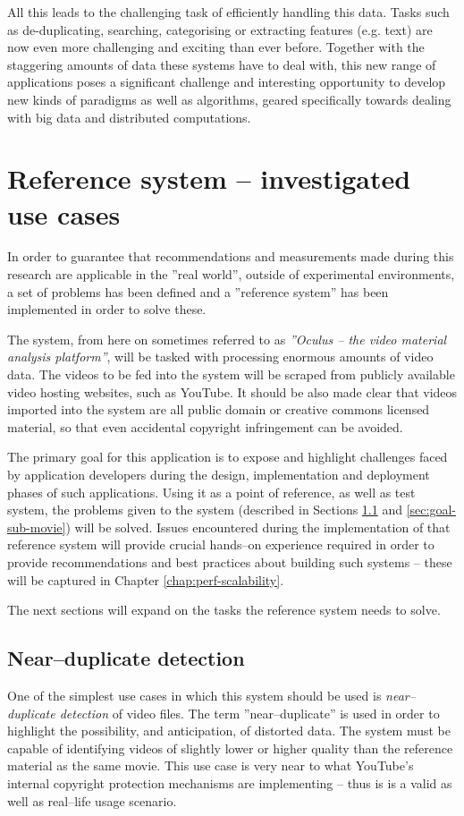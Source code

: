 All this leads to the challenging task of efficiently handling this data. Tasks such as de-duplicating, searching, categorising or extracting features (e.g. text) are now even more challenging and exciting than ever before. Together with the staggering amounts of data these systems have to deal with, this new range of applications poses a significant challenge and interesting opportunity to develop new kinds of paradigms as well as algorithms, geared specifically towards dealing with big data and distributed computations.


\section{Reference system -- investigated use cases}
\label{sec:ref-system}

In order to guarantee that recommendations and measurements made during this research are applicable in the ''real world'', outside of experimental environments, a set of problems has been defined and a ''reference system'' has been implemented in order to solve these.

The system, from here on sometimes referred to as \textit{''Oculus -- the video material analysis platform''}, will be tasked with processing enormous amounts of video data. The videos to be fed into the system will be scraped from publicly available video hosting websites, such as YouTube. It should be also made clear that videos imported into the system are all public domain or creative commons licensed material, so that even accidental copyright infringement can be avoided.

The primary goal for this application is to expose and highlight challenges faced by application developers during the design, implementation and deployment phases of such applications. Using it as a point of reference, as well as test system, the problems given to the system (described in Sections \ref{sec:goal-near-dup} and \ref{sec:goal-sub-movie}) will be solved. Issues encountered during the implementation of that reference system will provide crucial hands--on experience required in order to provide recommendations and best practices about building such systems -- these will be captured in Chapter \ref{chap:perf-scalability}.

The next sections will expand on the tasks the reference system needs to solve.


\subsection{Near--duplicate detection}
\label{sec:goal-near-dup}
One of the simplest use cases in which this system should be used is \textit{near--duplicate detection} of video files. The term ''near--duplicate'' is used in order to highlight the possibility, and anticipation, of distorted data. The system must be capable of identifying videos of slightly lower or higher quality than the reference material as the same movie. This use case is very near to what YouTube's \cite{youtube} internal copyright protection mechanisms are implementing -- thus is is a valid as well as real--life usage scenario.

